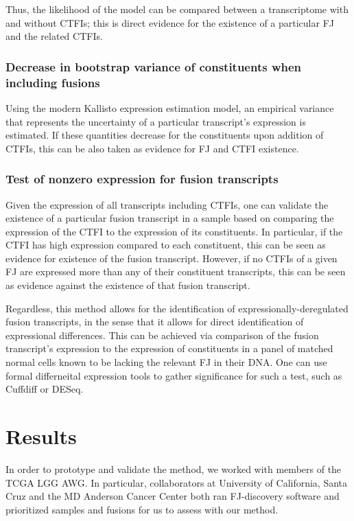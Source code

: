 Thus, the likelihood of the model can be compared between a transcriptome with and without CTFIs; this is direct evidence for the existence of a particular FJ and the related CTFIs.

\subsubsection{Decrease in bootstrap variance of constituents when including fusions}

Using the modern Kallisto\cite{bray_near-optimal_2015} expression estimation model, an empirical variance that represents the uncertainty of a particular transcript's expression is estimated. If these quantities decrease for the constituents upon addition of CTFIs, this can be also taken as evidence for FJ and CTFI existence.

\subsubsection{Test of nonzero expression for fusion transcripts}

Given the expression of all transcripts including CTFIs, one can validate the existence of a particular fusion transcript in a sample based on comparing the expression of the CTFI to the expression of its constituents. In particular, if the CTFI has high expression compared to each constituent, this can be seen as evidence for existence of the fusion transcript. However, if no CTFIs of a given FJ are expressed more than any of their constituent transcripts, this can be seen as evidence against the existence of that fusion transcript.

Regardless, this method allows for the identification of expressionally-deregulated fusion transcripts, in the sense that it allows for direct identification of expressional differences. This can be achieved via comparison of the fusion transcript's expression to the expression of constituents in a panel of matched normal cells known to be lacking the relevant FJ in their DNA. One can use formal differneital expression tools to gather significance for such a test, such as Cuffdiff\cite{trapnell_differential_2013} or DESeq\cite{anders_differential_2012}.

\section{Results}

In order to prototype and validate the method, we worked with members of the TCGA LGG AWG. In particular, collaborators at University of California, Santa Cruz and the MD Anderson Cancer Center both ran FJ-discovery software and prioritized samples and fusions for us to assess with our method.

